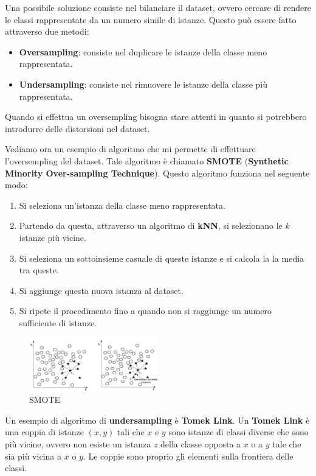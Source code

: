 Una possibile soluzione consiste nel bilanciare il dataset, ovvero cercare di
rendere le classi rappresentate da un numero simile di istanze. Questo può essere
fatto attraverso due metodi:
\begin{itemize}
      \item \textbf{Oversampling}: consiste nel duplicare le istanze della classe
            meno rappresentata.
      \item \textbf{Undersampling}: consiste nel rimuovere le istanze della classe
            più rappresentata.
\end{itemize}
\begin{nota}
      Quando si effettua un oversempling bisogna stare attenti in quanto si
      potrebbero introdurre delle distorsioni nel dataset.
\end{nota}
Vediamo ora un esempio di algoritmo che mi permette di effettuare l'oversempling
del dataset. Tale algoritmo è chiamato \textbf{SMOTE} (\textbf{Synthetic Minority
      Over-sampling Technique}). Questo algoritmo funziona nel seguente modo:
\begin{enumerate}
      \item Si seleziona un'istanza della classe meno rappresentata.
      \item Partendo da questa, attraverso un algoritmo di \textbf{kNN}, si
            selezionano le $k$ istanze più vicine.
      \item Si seleziona un sottoinsieme casuale di queste istanze e si calcola la
            la media tra queste.
      \item Si aggiunge questa nuova istanza al dataset.
      \item Si ripete il procedimento fino a quando non si raggiunge un numero
            sufficiente di istanze.
\end{enumerate}
\begin{figure}[!ht]
      \centering
      \includegraphics[width=0.5\textwidth]{./img/Preprocessing/smote.png}
      \caption{SMOTE}
      \label{fig:smote}
\end{figure}

Un esempio di algoritmo di \textbf{undersampling} è \textbf{Tomek Link}. Un
\textbf{Tomek Link} è una coppia di istanze $(x, y)$ tali che $x$ e $y$ sono
istanze di classi diverse che sono più vicine, ovvero non esiste un istanza 
$z$ della classe opposta a $x$ o a $y$ tale che sia più vicina a $x$ o $y$. Le 
coppie sono proprio gli elementi sulla frontiera delle classi.

